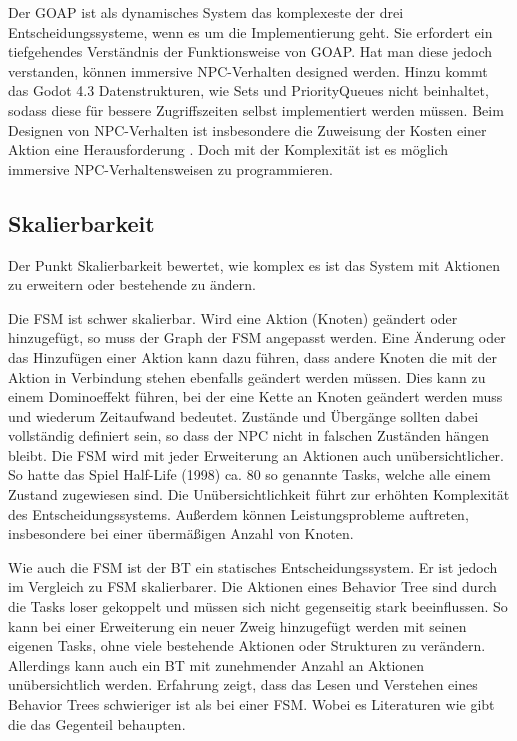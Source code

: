 Der GOAP ist als dynamisches System das komplexeste der drei Entscheidungssysteme, wenn es um die Implementierung geht. Sie erfordert ein tiefgehendes Verst\"{a}ndnis der Funktionsweise von GOAP. Hat man diese jedoch verstanden, k\"{o}nnen immersive NPC-Verhalten designed werden. Hinzu kommt das Godot 4.3 Datenstrukturen, wie Sets und PriorityQueues nicht beinhaltet, sodass diese f\"{u}r bessere Zugriffszeiten selbst implementiert werden m\"{u}ssen. Beim Designen von NPC-Verhalten ist insbesondere die Zuweisung der Kosten einer Aktion eine Herausforderung \autocite{Schwab2021}. Doch mit der Komplexit\"{a}t ist es m\"{o}glich immersive NPC-Verhaltensweisen zu programmieren.


\subsection{Skalierbarkeit}
\label{chap:skalierbarkeit}

Der Punkt Skalierbarkeit bewertet, wie komplex es ist das System mit Aktionen zu erweitern oder bestehende zu \"{a}ndern.

Die FSM ist schwer skalierbar. Wird eine Aktion (Knoten) ge\"{a}ndert oder hinzugef\"{u}gt, so muss der Graph der FSM angepasst werden. Eine \"{A}nderung oder das Hinzuf\"{u}gen einer Aktion kann dazu f\"{u}hren, dass andere Knoten die mit der Aktion in Verbindung stehen ebenfalls ge\"{a}ndert werden m\"{u}ssen. Dies kann zu einem Dominoeffekt f\"{u}hren, bei der eine Kette an Knoten ge\"{a}ndert werden muss und wiederum Zeitaufwand bedeutet. Zust\"{a}nde und \"{U}berg\"{a}nge sollten dabei vollst\"{a}ndig definiert sein, so dass der NPC nicht in falschen Zust\"{a}nden h\"{a}ngen bleibt. Die FSM wird mit jeder Erweiterung an Aktionen auch un\"{u}bersichtlicher. So hatte das Spiel Half-Life (1998) ca. 80 so genannte Tasks, welche alle einem Zustand zugewiesen sind.\autocite{U2023} Die Un\"{u}bersichtlichkeit f\"{u}hrt zur erh\"{o}hten Komplexit\"{a}t des Entscheidungssystems. Au\ss{}erdem k\"{o}nnen Leistungsprobleme auftreten, insbesondere bei einer \"{u}berm\"{a}\ss{}igen Anzahl von Knoten.\autocite{U2023}

Wie auch die FSM ist der BT ein statisches Entscheidungssystem. Er ist jedoch im Vergleich zu FSM skalierbarer. Die Aktionen eines Behavior Tree sind durch die Tasks loser gekoppelt und m\"{u}ssen sich nicht gegenseitig stark beeinflussen. So kann bei einer Erweiterung ein neuer Zweig hinzugef\"{u}gt werden mit seinen eigenen Tasks, ohne viele bestehende Aktionen oder Strukturen zu ver\"{a}ndern.\autocite{aiag}  Allerdings kann auch ein BT mit zunehmender Anzahl an Aktionen un\"{u}bersichtlich werden. Erfahrung zeigt, dass das Lesen und Verstehen eines Behavior Trees schwieriger ist als bei einer FSM. Wobei es Literaturen wie \autocite{} gibt die das Gegenteil behaupten.

